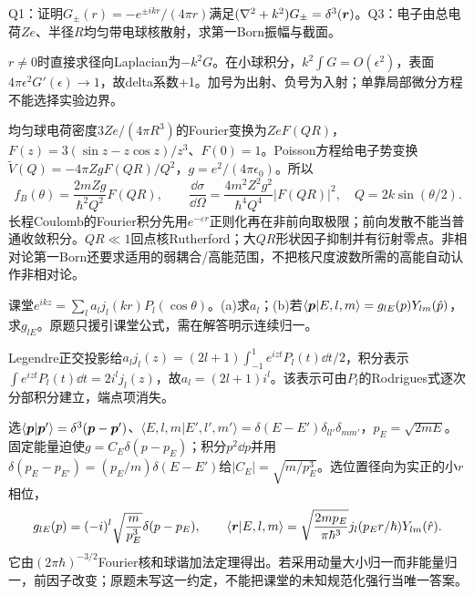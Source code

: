 \begin{exercise}
Q1：证明$G_\pm(r)=-e^{\pm ikr}/(4\pi r)$满足$(\nabla^2+k^2)G_\pm=\delta^3(\boldsymbol{r})$。Q3：电子由总电荷$Ze$、半径$R$均匀带电球核散射，求第一Born振幅与截面。
\end{exercise}
\begin{solution}
$r\ne0$时直接求径向Laplacian为$-k^2G$。在小球积分，$k^2\int G=O(\epsilon^2)$，表面$4\pi\epsilon^2G'(\epsilon)\to1$，故delta系数+1。加号为出射、负号为入射；单靠局部微分方程不能选择实验边界。

均匀球电荷密度$3Ze/(4\pi R^3)$的Fourier变换为$Ze F(QR)$，$F(z)=3(\sin z-z\cos z)/z^3$、$F(0)=1$。Poisson方程给电子势变换$\widetilde V(Q)=-4\pi ZgF(QR)/Q^2$，$g=e^2/(4\pi\epsilon_0)$。所以
\[
 f_B(\theta)=\frac{2mZg}{\hbar^2Q^2}F(QR),\qquad
 \frac{\dd\sigma}{\dd\Omega}=\frac{4m^2Z^2g^2}{\hbar^4Q^4}|F(QR)|^2,\quad Q=2k\sin(\theta/2).
\]
长程Coulomb的Fourier积分先用$e^{-\varepsilon r}$正则化再在非前向取极限；前向发散不能当普通收敛积分。$QR\ll1$回点核Rutherford；大$QR$形状因子抑制并有衍射零点。非相对论第一Born还要求适用的弱耦合/高能范围，不把核尺度波数所需的高能自动认作非相对论。
\end{solution}

\begin{exercise}
课堂$e^{ikz}=\sum_l a_lj_l(kr)P_l(\cos\theta)$。(a)求$a_l$；(b)若$\langle\boldsymbol{p}|E,l,m\rangle=g_{lE}(p)Y_{lm}(\hat p)$，求$g_{lE}$。原题只援引课堂公式，需在解答明示连续归一。
\end{exercise}
\begin{solution}
Legendre正交投影给$a_lj_l(z)=(2l+1)\int_{-1}^1e^{izt}P_l(t)\dd t/2$，积分表示$\int e^{izt}P_l(t)\dd t=2i^lj_l(z)$，故$a_l=(2l+1)i^l$。该表示可由$P_l$的Rodrigues式逐次分部积分建立，端点项消失。

选$\langle\boldsymbol{p}|\boldsymbol{p}'\rangle=\delta^3(\boldsymbol{p}-\boldsymbol{p}')$、$\langle E,l,m|E',l',m'\rangle=\delta(E-E')\delta_{ll'}\delta_{mm'}$，$p_E=\sqrt{2mE}$。固定能量迫使$g=C_E\delta(p-p_E)$；积分$p^2\dd p$并用$\delta(p_E-p_{E'})=(p_E/m)\delta(E-E')$给$|C_E|=\sqrt{m/p_E^3}$。选位置径向为实正的小$r$相位，
\[
 g_{lE}(p)=(-i)^l\sqrt{\frac m{p_E^3}}\delta(p-p_E),\qquad
 \langle\boldsymbol{r}|E,l,m\rangle=\sqrt{\frac{2mp_E}{\pi\hbar^3}}
 j_l(p_Er/\hbar)Y_{lm}(\hat r).
\]
它由$(2\pi\hbar)^{-3/2}$Fourier核和球谐加法定理得出。若采用动量大小归一而非能量归一，前因子改变；原题未写这一约定，不能把课堂的未知规范化强行当唯一答案。
\end{solution}

